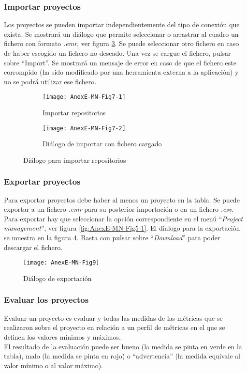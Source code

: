 \subsubsection{Importar proyectos}
Los proyectos se pueden importar independientemente del tipo de conexión que exista. Se mostrará un diálogo que permite seleccionar o arrastrar al cuadro un fichero con formato \textit{.emr}, ver figura \ref{fig:AnexE-MN-Fig7}. Se puede seleccionar otro fichero en caso de haber escogido un fichero no deseado. Una vez se cargue el fichero, pulsar sobre ``Import''. Se mostrará un mensaje de error en caso de que el fichero este corrompido (ha sido modificado por una herramienta externa a la aplicación) y no se podrá utilizar ese fichero.
\begin{figure}[!h]
	\centering
	\begin{subfigure}{.45\textwidth}
		\centering
		\texttt{[image: AnexE-MN-Fig7-1]}
		\caption{Importar repositorios}
		\label{fig:AnexE-MN-Fig7-1}
	\end{subfigure}\hfill
	\begin{subfigure}{.45\textwidth}
		\centering
		\texttt{[image: AnexE-MN-Fig7-2]}
		\caption{Diálogo de importar con fichero cargado}
		\label{fig:AnexE-MN-Fig7-2}
	\end{subfigure}
	\caption{Diálogo para importar repositorios}
	\label{fig:AnexE-MN-Fig7}
\end{figure}
\subsubsection{Exportar proyectos}
Para exportar proyectos debe haber al menos un proyecto en la tabla.
Se puede exportar a un fichero \textit{.emr} para su posterior importación o en un fichero \textit{.csv}. Para exportar hay que seleccionar la opción correspondiente en el menú ``\textit{Project management}'', ver figura \ref{fig:AnexE-MN-Fig5-1}. El dialogo para la exportación se muestra en la figura \ref{fig:AnexE-MN-Fig9}. Basta con pulsar sobre ``\textit{Download}'' para poder descargar el fichero.
\begin{figure}[!h]
	\centering
	\texttt{[image: AnexE-MN-Fig9]}
	\caption{Diálogo de exportación}\label{fig:AnexE-MN-Fig9}
\end{figure}
\FloatBarrier
\subsubsection{Evaluar los proyectos}
Evaluar un proyecto es evaluar y todas las medidas de las métricas que se realizaron sobre el proyecto en relación a un perfil de métricas en el que se definen los valores mínimos y máximos.\\
El resultado de la evaluación puede ser bueno (la medida se pinta en verde en la tabla), malo (la medida se pinta en rojo) o ``advertencia'' (la medida equivale al valor mínimo o al valor máximo).

